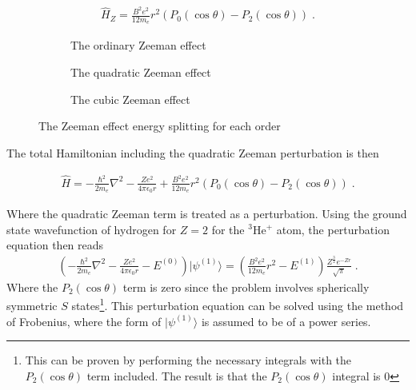         \begin{align}
            \hat{H}_Z = \frac{B^2e^2}{12m_e}r^2 (P_0(\cos \theta) - P_2(\cos \theta))\;.
        \end{align}



        \begin{figure}[h]
            \centering
            \begin{subfigure}{0.28\linewidth}
                \resizebox{\textwidth}{!}{}
                \caption{The ordinary Zeeman effect}
                \label{fig:a}
            \end{subfigure}
            \hfill
            \begin{subfigure}{0.32\linewidth}
                \resizebox{0.9\textwidth}{!}{}
                \caption{The quadratic Zeeman effect}
                \label{fig:b}
            \end{subfigure}
            \hfill
            \begin{subfigure}{0.28\linewidth}
                \resizebox{\textwidth}{!}{}
                \caption{The cubic Zeeman effect}
                \label{fig:c}
            \end{subfigure}
            \caption{The Zeeman effect energy splitting for each order}
            \label{fig:overall}
        \end{figure}

        \noindent The total Hamiltonian including the quadratic Zeeman perturbation is then 

        \begin{align}
            \hat{H} = - \frac{\hbar^2}{2m_e} \nabla^2 - \frac{Ze^2}{4\pi \epsilon_0 r} + \frac{B^2e^2}{12m_e}r^2 (P_0(\cos \theta) - P_2(\cos \theta))\;. \label{eq:r_sqrd_perturbation}
        \end{align}

        \noindent Where the quadratic Zeeman term is treated as a perturbation. Using the ground state wavefunction of hydrogen for $Z = 2$ for the $^3$He$^+$ atom, the perturbation equation then reads 
        \begin{align}
            \left(- \frac{\hbar^2}{2m_e} \nabla^2 - \frac{Ze^2}{4\pi \epsilon_0 r} - E^{(0)} \right) \vert \psi^{(1)} \rangle = \left(\frac{B^2e^2}{12m_e}r^2 - E^{(1)} \right) \frac{Z^\frac{3}{2} e^{-Zr}}{\sqrt{\pi}}\;.
        \end{align}
        \noindent Where the $P_2(\cos \theta)$ term is zero since the problem involves spherically symmetric $S$ states\footnote{This can be proven by performing the necessary integrals with the $P_2(\cos\theta)$ term included. The result is that the $P_2(\cos \theta)$ integral is 0}. This perturbation equation can be solved using the method of Frobenius, where the form of $\vert \psi^{(1)} \rangle$ is assumed to be of a power series.

